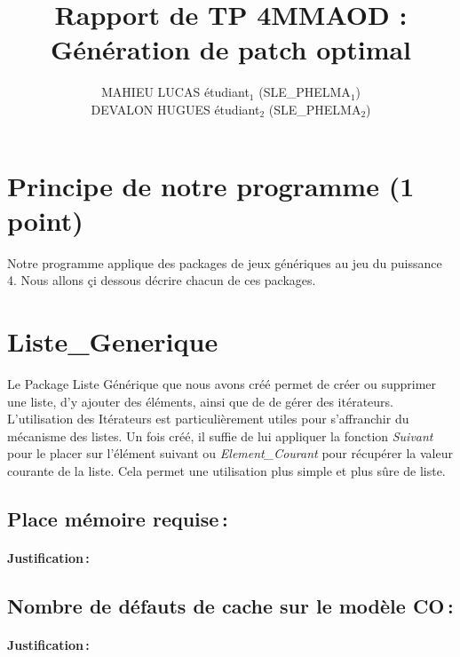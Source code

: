 \documentclass[a4paper, 10pt, french]{article}
\title{Rapport de TP 4MMAOD : Génération de patch optimal}
\author{
MAHIEU LUCAS étudiant$_1$ (SLE\_PHELMA$_1$) 
\\ DEVALON HUGUES étudiant$_2$ (SLE\_PHELMA$_2$) 
}
\begin{document}
\maketitle


\section{Principe de notre  programme (1 point)}
{
	Notre programme applique des packages de jeux génériques au jeu du puissance 4.
	Nous allons çi dessous décrire chacun de ces packages.
} 

\section{Liste\_Generique}
    {
    Le Package Liste Générique que nous avons créé permet de créer ou supprimer une liste, d'y ajouter des éléments, ainsi que de de gérer des itérateurs. L'utilisation des Itérateurs est particulièrement utiles pour s'affranchir du mécanisme des listes. Un fois créé, il suffie de lui appliquer la fonction {\em Suivant} pour le placer sur l'élément suivant ou {\em Element\_Courant} pour récupérer la valeur courante de la liste. Cela permet une utilisation plus simple et plus sûre de liste.
     } 
  \subsection{Place mémoire requise\,: }
    \paragraph{Justification\,: }
    {
    	
    }

  \subsection{Nombre de défauts de cache sur le modèle CO\,: }
    \paragraph{Justification\,: }
    { 
    
    }
\end{document}
